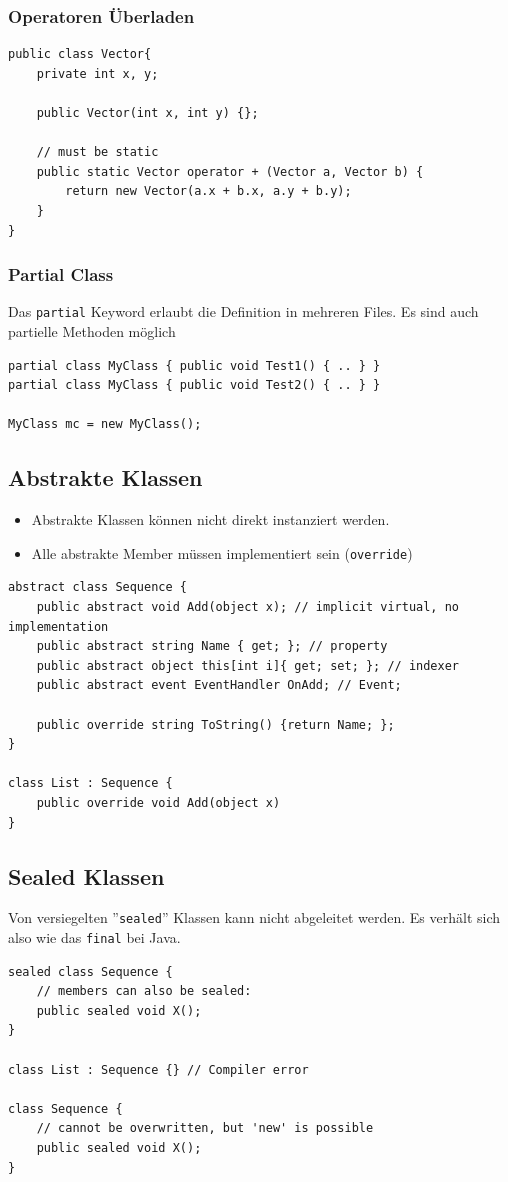 \subsubsection{Operatoren Überladen}
\begin{lstlisting}
public class Vector{
	private int x, y;
	
	public Vector(int x, int y) {};
	
	// must be static
	public static Vector operator + (Vector a, Vector b) {
		return new Vector(a.x + b.x, a.y + b.y);
	}						
}
\end{lstlisting}

\subsubsection{Partial Class}
Das \lstinline|partial| Keyword erlaubt die Definition in mehreren Files. Es sind auch partielle Methoden möglich
\begin{lstlisting}
partial class MyClass { public void Test1() { .. } }
partial class MyClass { public void Test2() { .. } }

MyClass mc = new MyClass();
\end{lstlisting}

\subsection{Abstrakte Klassen}
\begin{itemize}
	\item Abstrakte Klassen können nicht direkt instanziert werden. 
	\item Alle abstrakte Member müssen implementiert sein (\lstinline|override|)
\end{itemize}
\begin{lstlisting}
abstract class Sequence {
	public abstract void Add(object x); // implicit virtual, no implementation
	public abstract string Name { get; }; // property
	public abstract object this[int i]{ get; set; }; // indexer
	public abstract event EventHandler OnAdd; // Event;
	
	public override string ToString() {return Name; }; 
}

class List : Sequence {
	public override void Add(object x)
}
\end{lstlisting}

\subsection{Sealed Klassen}
Von versiegelten ''\lstinline|sealed|'' Klassen kann nicht abgeleitet werden. Es verhält sich also wie das \lstinline|final| bei Java.
\begin{lstlisting}
sealed class Sequence {
	// members can also be sealed:
	public sealed void X();
}

class List : Sequence {} // Compiler error

class Sequence {
	// cannot be overwritten, but 'new' is possible
	public sealed void X();
}

\end{lstlisting}

